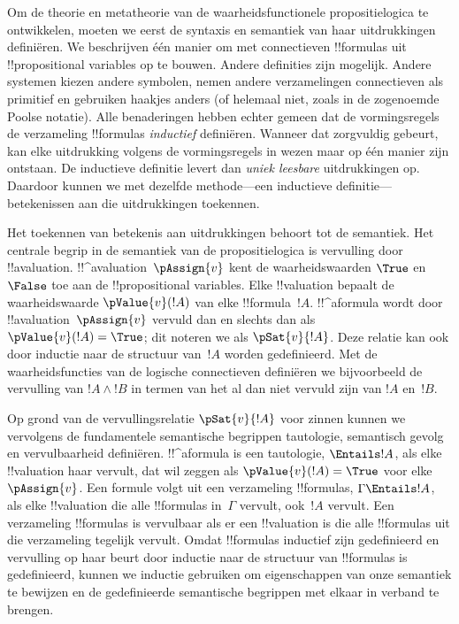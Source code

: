 \documentclass[openany]{memoir}
\begin{document}
Om de theorie en metatheorie van de waarheidsfunctionele
propositielogica te ontwikkelen, moeten we eerst de syntaxis en
semantiek van haar uitdrukkingen definiëren. We beschrijven één manier
om met connectieven !!{formula}s uit !!{propositional variable}s op te
bouwen. Andere definities zijn mogelijk. Andere systemen kiezen andere
symbolen, nemen andere verzamelingen connectieven als primitief en
gebruiken haakjes anders (of helemaal niet, zoals in de zogenoemde
Poolse notatie). Alle benaderingen hebben echter gemeen dat de
vormingsregels de verzameling !!{formula}s \emph{inductief} definiëren.
Wanneer dat zorgvuldig gebeurt, kan elke uitdrukking volgens de
vormingsregels in wezen maar op één manier zijn ontstaan. De inductieve
definitie levert dan \emph{uniek leesbare} uitdrukkingen op. Daardoor
kunnen we met dezelfde methode---een inductieve definitie---betekenissen
aan die uitdrukkingen toekennen.

Het toekennen van betekenis aan uitdrukkingen behoort tot de semantiek.
Het centrale begrip in de semantiek van de propositielogica is
vervulling door !!a{valuation}. !!^a{valuation}~$\pAssign{v}$ kent de
waarheidswaarden $\True$ en $\False$ toe aan de !!{propositional
variable}s. Elke !!{valuation} bepaalt de waarheidswaarde
$\pValue{v}(!A)$ van elke !!{formula}~$!A$. !!^a{formula} wordt door
!!a{valuation}~$\pAssign{v}$ vervuld dan en slechts dan als
$\pValue{v}(!A) = \True$; dit noteren we als $\pSat{v}{!A}$. Deze
relatie kan ook door inductie naar de structuur van~$!A$ worden
gedefinieerd. Met de waarheidsfuncties van de logische connectieven
definiëren we bijvoorbeeld de vervulling van $!A \land !B$ in termen
van het al dan niet vervuld zijn van $!A$ en~$!B$.

Op grond van de vervullingsrelatie $\pSat{v}{!A}$ voor zinnen kunnen we
vervolgens de fundamentele semantische begrippen tautologie, semantisch
gevolg en vervulbaarheid definiëren. !!^a{formula} is een tautologie,
$\Entails !A$, als elke !!{valuation} haar vervult, dat wil zeggen als
$\pValue{v}(!A) = \True$ voor elke~$\pAssign{v}$. Een formule volgt uit
een verzameling !!{formula}s, $\Gamma \Entails !A$, als elke
!!{valuation} die alle !!{formula}s in~$\Gamma$ vervult, ook~$!A$
vervult. Een verzameling !!{formula}s is vervulbaar als er een
!!{valuation} is die alle !!{formula}s uit die verzameling tegelijk
vervult. Omdat !!{formula}s inductief zijn gedefinieerd en vervulling
op haar beurt door inductie naar de structuur van !!{formula}s is
gedefinieerd, kunnen we inductie gebruiken om eigenschappen van onze
semantiek te bewijzen en de gedefinieerde semantische begrippen met
elkaar in verband te brengen.
\endgroup
\end{document}
